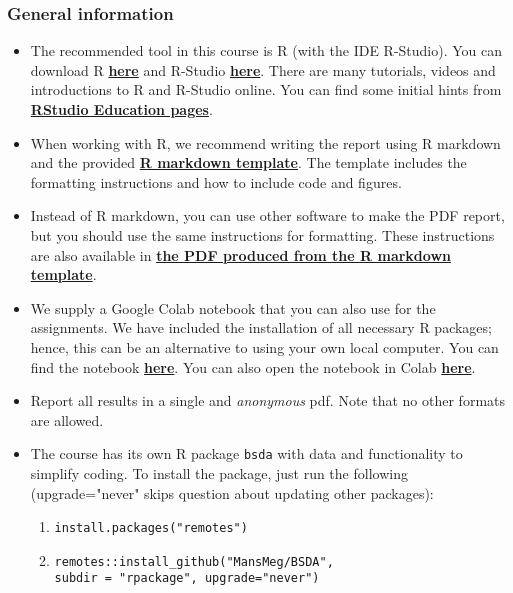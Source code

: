 
\subsubsection*{General information}


\begin{itemize}
\item The recommended tool in this course is R (with the IDE R-Studio). You can download R \href{https://cran.r-project.org/}{\textbf{here}} and R-Studio \href{https://www.rstudio.com/products/rstudio/download/}{\textbf{here}}. There are many tutorials, videos and introductions to R and R-Studio online. You can find some initial hints from \href{https://education.rstudio.com/}{\textbf{RStudio Education pages}}.
\item When working with R, we recommend writing the report using R markdown and the provided \href{https://github.com/MansMeg/BSDA/blob/main/templates/assignment_template.rmd}{\textbf{R markdown template}}.
The template includes the formatting instructions and how to include code and figures.
\item Instead of R markdown, you can use other software to make the PDF report, but you should use the same instructions for formatting. These instructions are also available in \href{https://github.com/MansMeg/BSDA/blob/main/templates/assignment_template.pdf}{\textbf{the PDF produced from the R markdown template}}.
\item We supply a Google Colab notebook that you can also use for the assignments. We have included the installation of all necessary R packages; hence, this can be an alternative to using your own local computer. You can find the notebook \href{https://github.com/MansMeg/BSDA/blob/main/templates/bsda_colab_template.ipynb}{\textbf{here}}. You can also open the notebook in Colab \href{https://colab.research.google.com/github/MansMeg/BSDA/blob/main/templates/bsda_colab_template.ipynb}{\textbf{here}}.
\item Report all results in a single and \emph{anonymous} pdf. Note that no other formats are allowed.
\item The course has its own R package \texttt{bsda} with data and functionality to simplify coding. To install the package, just run the following (upgrade="never" skips question about updating other packages):
\begin{enumerate}
\item \texttt{install.packages("remotes")}
\item \texttt{remotes::install\_github("MansMeg/BSDA", \\ subdir = "rpackage", upgrade="never")}

\end{enumerate}
\end{itemize}
